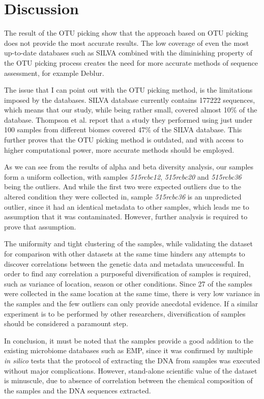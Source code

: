 \documentclass[12pt,twocolumn]{article} %
\begin{document}
\section{Discussion}
The result of the OTU picking show that the approach based on OTU picking does not provide the most accurate results. The low coverage of even the most up-to-date databases such as SILVA combined with the diminishing property of the OTU picking process creates the need for more accurate methods of sequence assessment, for example Deblur\cite{Amir}.
\par
The issue that I can point out with the OTU picking method, is the limitations imposed by the databases. SILVA database currently contains 177222 sequences, which means that our study, while being rather small, covered almost 10\% of the database. Thompson et al.\cite{Thompson2017} report that a study they performed using just under 100 samples from different biomes covered  47\% of the SILVA database. This further proves that the OTU picking method is outdated, and with access to higher computational power, more accurate methods should be employed.
\par
As we can see from the results of alpha and beta diversity analysis, our samples form a uniform collection, with samples \textit{515rcbc12}, \textit{515rcbc20} and \textit{515rcbc36} being the outliers. And while the first two were expected outliers due to the altered condition they were collected in, sample \textit{515rcbc36} is an unpredicted outlier, since it had an identical metadata to other samples, which leads me to assumption that it was contaminated. However, further analysis is required to prove that assumption.
\par
The uniformity and tight clustering of the samples, while validating the dataset for comparison with other datasets at the same time hinders any attempts to discover correlations between the genetic data and metadata unsuccessful. In order to find any correlation a purposeful diversification of samples is required, such as variance of location, season or other conditions. Since 27 of the samples were collected in the same location at the same time, there is very low variance in the samples and the few outliers can only provide anecdotal evidence. If a similar experiment is to be performed by other researchers, diversification of samples should be considered a paramount step.
\par
In conclusion, it must be noted that the samples provide a good addition to the existing microbiome databases such as EMP, since it was confirmed by multiple \textit{in silico} tests that the protocol of extracting the DNA from samples was executed without major complications. However, stand-alone scientific value of the dataset is minuscule, due to absence of correlation between the chemical composition of the samples and the DNA sequences extracted. 
 


\newpage

\end{document}
